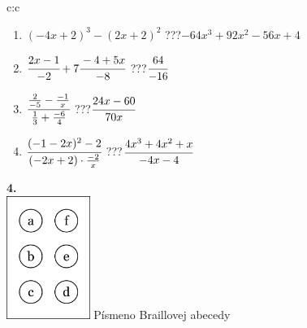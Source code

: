 \documentclass[10pt]{report}
\begin{document}
\begin{tabular}{c:c}
\begin{minipage}[c][104.5mm][t]{0.5\linewidth}
\begin{center}
\begin{minipage}{0.79\linewidth}
\begin{center}
\begin{varwidth}{\linewidth}
\begin{enumerate}
\item $(-4x+2)^3-(2x+2)^2$\quad \dotfill\; ???\;\dotfill \quad $-64x^3+92x^2-56x+4$
\item $\cfrac{2x-1}{-2}+7\cfrac{-4+5x}{-8}$\quad \dotfill\; ???\;\dotfill \quad $\cfrac{64}{-16}$
\item $\cfrac{\frac{2}{-5}-\frac{-1}{x}}{\frac{1}{3}+\frac{-6}{4}}$\quad \dotfill\; ???\;\dotfill \quad $\cfrac{24x-60}{70x}$
\item $\cfrac{(-1-2x)^2-2}{(-2x+2)\cdot\frac{-2}{x}}$\quad \dotfill\; ???\;\dotfill \quad $\cfrac{4x^3+4x^2+x}{-4x-4}$
\end{enumerate}
\end{varwidth}
\end{center}
\end{minipage}
\begin{minipage}{0.20\linewidth}
\begin{center}
{\Huge\bfseries 4.} \\[2mm]
\includegraphics[height=40mm]{../images/braille.png}
{\small Písmeno Braillovej abecedy}
\end{center}
\end{minipage}
\end{center}
\end{minipage}
%
\end{tabular}
\newpage
\thispagestyle{empty}
\end{document}

